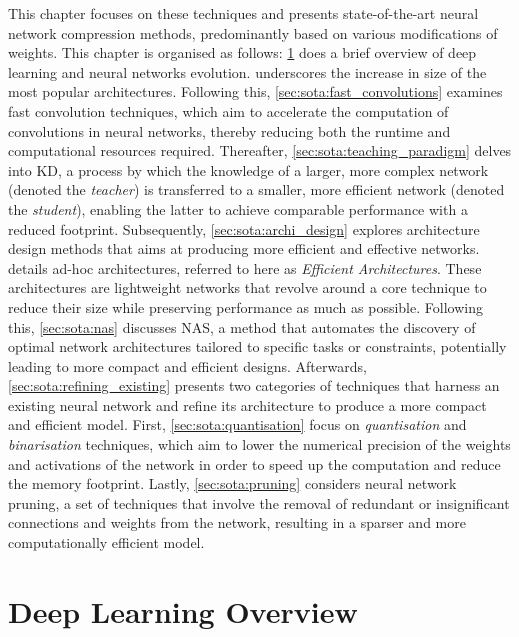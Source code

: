 This chapter focuses on these techniques and presents state-of-the-art neural
network compression methods, predominantly based on various modifications of
weights. This chapter is organised as follows: \cref{sec:sota:dl_overview} does
a brief overview of deep learning and neural networks evolution.
 underscores the increase in size of the most
popular architectures. Following this, \cref{sec:sota:fast_convolutions}
examines fast convolution techniques, which aim to accelerate the computation of
convolutions in neural networks, thereby reducing both the runtime and
computational resources required. Thereafter, \cref{sec:sota:teaching_paradigm}
delves into \ac{KD}, a process by which the knowledge of a larger, more complex
network (denoted the \emph{teacher}) is transferred to a smaller, more efficient
network (denoted the \emph{student}), enabling the latter to achieve comparable
performance with a reduced footprint. Subsequently, \cref{sec:sota:archi_design}
explores architecture design methods that aims at producing more efficient and
effective networks.  details ad-hoc
architectures, referred to here as \emph{Efficient Architectures}. These
architectures are lightweight networks that revolve around a core technique to reduce
their size while preserving performance as much as possible. Following this,
\cref{sec:sota:nas} discusses \ac{NAS}, a method that automates the discovery of
optimal network architectures tailored to specific tasks or constraints,
potentially leading to more compact and efficient designs. Afterwards,
\cref{sec:sota:refining_existing} presents two categories of techniques that
harness an existing neural network and refine its architecture to produce a more
compact and efficient model. First, \cref{sec:sota:quantisation} focus on
\emph{quantisation} and \emph{binarisation} techniques, which aim to lower the
numerical precision of the weights and activations of the network in order to
speed up the computation and reduce the memory footprint. Lastly,
\cref{sec:sota:pruning} considers neural network pruning, a set of techniques
that involve the removal of redundant or insignificant connections and weights
from the network, resulting in a sparser and more computationally efficient
model.\\


\section{Deep Learning Overview}\label{sec:sota:dl_overview}

